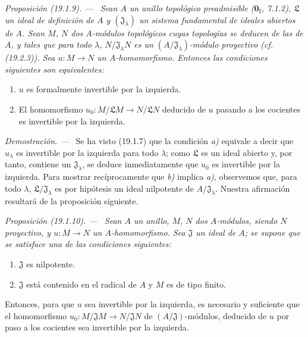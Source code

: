 \documentclass[10pt,oneside]{book}
\makeatletter
\newcommand{\setmanualcurrentlabel}[1]{\def\@currentlabel{#1}}
\newcommand{\oldpage}[2][]{%
  \setcounter{footnote}{0}%
  \marginpar{\scriptsize\textbf{#1}~|~#2}\ignorespaces}
\newenvironment{proposition}[1][]{%
  \setmanualcurrentlabel{#1}\par\medskip\noindent\itshape Proposición (#1). ---\ }{\par}
\newenvironment{proof}{%
  \par\medskip\noindent\textit{Demostración. ---\ }}{\par}
\makeatother
\begin{document}
\begin{proposition}[19.1.9]
\label{0.19.1.9-es}
Sean $A$ un anillo topológico \textup{preadmisible ($\mathbf{0}_{\mathrm I}$,
7.1.2)}, $\mathfrak L$ un ideal de definición de $A$ y
$(\mathfrak J_\lambda)$ un sistema fundamental de ideales abiertos de $A$.
Sean $M$, $N$ dos $A$-módulos topológicos cuyas topologías se deducen
de las de $A$, y tales que para todo $\lambda$,
$N/\mathfrak J_\lambda N$ es un $(A/\mathfrak J_\lambda)$-módulo proyectivo
\textup{(cf. (19.2.3))}. Sea $u:M\to N$ un $A$-homomorfismo. Entonces las condiciones
siguientes son equivalentes:
\begin{enumerate}
  \item[\textup{a)}] $u$ es formalmente invertible por la izquierda.

  \oldpage[0\textsubscript{IV-1}]{75}

  \item[\textup{b)}] El homomorfismo
  $u_0:M/\mathfrak LM\to N/\mathfrak LN$ deducido de $u$ pasando a los
  cocientes es invertible por la izquierda.
\end{enumerate}
\end{proposition}

\begin{proof}
Se ha visto (19.1.7) que la condición \emph{a)} equivale a decir que $u_\lambda$ es
invertible por la izquierda para todo $\lambda$; como $\mathfrak L$ es un ideal
abierto y, por tanto, contiene un $\mathfrak J_\lambda$, se deduce inmediatamente que
$u_0$ es invertible por la izquierda. Para mostrar recíprocamente que \emph{b)} implica \emph{a)},
observemos que, para todo $\lambda$, $\mathfrak L/\mathfrak J_\lambda$ es por
hipótesis un ideal nilpotente de $A/\mathfrak J_\lambda$. Nuestra afirmación
resultará de la proposición siguiente.
\end{proof}

\begin{proposition}[19.1.10]
\label{0.19.1.10-es}
Sean $A$ un anillo, $M$, $N$ dos $A$-módulos, siendo $N$ proyectivo, y
$u:M\to N$ un $A$-homomorfismo. Sea $\mathfrak J$ un ideal de $A$; se
supone que se satisface \textup{una} de las condiciones siguientes:
\begin{enumerate}
  \item[\textup{(i)}] $\mathfrak J$ es nilpotente.
  \item[\textup{(ii)}] $\mathfrak J$ está contenido en el radical de $A$ y $M$ es de
  tipo finito.
\end{enumerate}
Entonces, para que $u$ sea invertible por la izquierda, es necesario y suficiente que
el homomorfismo
$u_0:M/\mathfrak JM\to N/\mathfrak JN$ de $(A/\mathfrak J)$-módulos, deducido
de $u$ por paso a los cocientes sea invertible por la izquierda.
\end{proposition}
\end{document}
